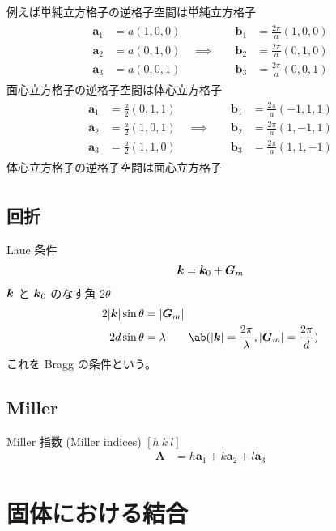 \documentclass[uplatex,dvipdfmx,a4paper,11pt]{jlreq}
\renewcommand{\aa}{\bm{a}}
\newcommand{\bb}{\bm{b}}
\begin{document}
例えば単純立方格子の逆格子空間は単純立方格子
\begin{align}
  \begin{alignedat}{3}
    \aa_1 & = a(1, 0, 0) & \bb_1 & = \frac{2\pi}{a}(1, 0, 0) \\
    \aa_2 & = a(0, 1, 0) \quad\implies\quad & \bb_2 & = \frac{2\pi}{a}(0, 1, 0) \\
    \aa_3 & = a(0, 0, 1) & \bb_3 & = \frac{2\pi}{a}(0, 0, 1)
  \end{alignedat}
\end{align}
面心立方格子の逆格子空間は体心立方格子
\begin{align}
  \begin{alignedat}{3}
    \aa_1 & = \frac{a}{2}(0, 1, 1) & \bb_1 & = \frac{2\pi}{a}(-1, 1, 1) \\
    \aa_2 & = \frac{a}{2}(1, 0, 1) \quad\implies\quad & \bb_2 & = \frac{2\pi}{a}(1, -1, 1) \\
    \aa_3 & = \frac{a}{2}(1, 1, 0) & \bb_3 & = \frac{2\pi}{a}(1, 1, -1)
  \end{alignedat}
\end{align}
体心立方格子の逆格子空間は面心立方格子
\begin{align}
\end{align}

\subsection{回折}
Laue 条件
\begin{align}
  \bm{k} = \bm{k}_0 + \bm{G}_m
\end{align}
$\bm{k}$ と $\bm{k}_0$ のなす角 $2\theta$
\begin{align}
  2|\kk|\sin\theta & = |\bm{G}_m|                                                                    \\
  2d\sin\theta     & = \lambda \qquad \ab(|\kk| = \frac{2\pi}{\lambda}, |\bm{G}_m| = \frac{2\pi}{d})
\end{align}
これを Bragg の条件という。

\subsection{Miller}
Miller 指数 (Miller indices)
$[h\ k\ l]$
\begin{align}
  \bm{A} & = h\aa_1 + k\aa_2 + l\aa_3
\end{align}



\section{固体における結合}
\end{document}
